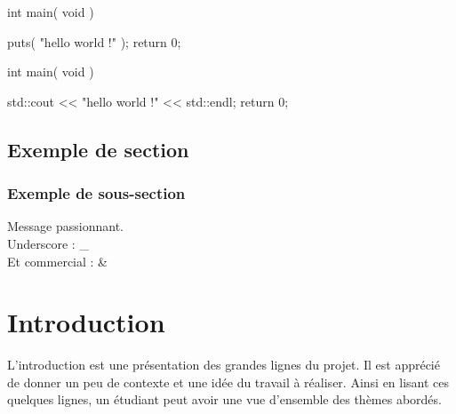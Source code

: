 \documentclass{42}
\begin{document}





    \begin{42ccode}
int main( void ) {

    puts( "hello world !" );
    return 0;
}
\end{42ccode}


    \begin{42cppcode}
int main( void ) {

    std::cout << "hello world !" << std::endl;
    return 0;
}
\end{42cppcode}

    \section{Exemple de section}

        \subsection{Exemple de sous-section}

            Message passionnant.\\

            Underscore : \_\\

            Et commercial : \&



\chapter{Introduction}

    L'introduction est une pr\'esentation des grandes lignes du
    projet. Il est appr\'eci\'e de donner un peu de contexte et une
    id\'ee du travail \`a r\'ealiser. Ainsi en lisant ces quelques
    lignes, un \'etudiant peut avoir une vue d'ensemble des th\`emes
    abord\'es.
\end{document}
